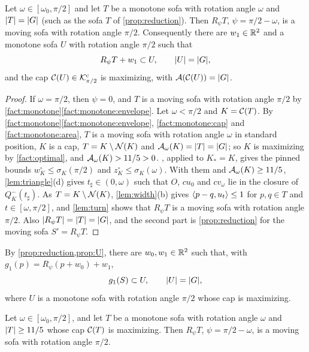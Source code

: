 \begin{proposition}\label{prop:U}
Let $\omega\in[\omega_0,\pi/2]$ and let $T$ be a monotone sofa with rotation
angle $\omega$ and $\lvert T\rvert=\lvert G\rvert$ (such as the sofa $T$ of
\cref{prop:reduction}). Then $R_\psi T$, $\psi=\pi/2-\omega$, is a moving sofa
with rotation angle $\pi/2$. Consequently there are $w_1\in\mathbb{R}^2$ and a monotone
sofa $U$ with rotation angle $\pi/2$ such that
\[
  R_\psi T+w_1\subset U,\qquad\lvert U\rvert=\lvert G\rvert,
\]
and the cap $\mathcal{C}(U)\in\mathcal{K}^{\mathrm{c}}_{\pi/2}$ is maximizing, with $\mathcal{A}(\mathcal{C}(U))=\lvert G\rvert$.
\end{proposition}

\begin{proof}
If $\omega=\pi/2$, then $\psi=0$, and $T$ is a moving sofa with rotation angle
$\pi/2$ by \cref{fact:monotone}\ref{fact:monotone:envelope}. Let $\omega<\pi/2$
and $K=\mathcal{C}(T)$. By \cref{fact:monotone}\ref{fact:monotone:envelope},
\ref{fact:monotone:cap} and \ref{fact:monotone:area}, $T$ is a moving sofa with
rotation angle $\omega$ in standard position, $K$ is a cap, $T=K\setminus\mathcal{N}(K)$
and $\mathcal{A}_\omega(K)=\lvert T\rvert=\lvert G\rvert$; so $K$ is maximizing by \cref{fact:optimal},
and $\mathcal{A}_\omega(K)>11/5>0$. , applied to $K_*=K$, gives
the pinned bounds $w^\circ_K\le\sigma_K(\pi/2)$ and
$z^\circ_K\le\sigma_K(\omega)$. With them and $\mathcal{A}_\omega(K)\ge11/5$,
\cref{lem:triangle}(d) gives $t_\sharp\in(0,\omega)$ such that $O$, $cu_0$ and
$cv_\omega$ lie in the closure of $Q^-_K(t_\sharp)$. As $T=K\setminus\mathcal{N}(K)$,
\cref{lem:width}(b) gives $\langle p-q,u_t\rangle\le1$ for $p,q\in T$ and
$t\in[\omega,\pi/2]$, and \cref{lem:turn} shows that $R_\psi T$ is a moving sofa
with rotation angle $\pi/2$. Also $\lvert R_\psi T\rvert=\lvert T\rvert=\lvert G\rvert$, and the
second part is \cref{prop:reduction} for the moving sofa $S'=R_\psi T$.
\end{proof}

By \cref{prop:reduction,prop:U}, there are $w_0,w_1\in\mathbb{R}^2$ such that, with
$g_1(p)=R_\psi(p+w_0)+w_1$,
\begin{equation}\label{eq:contained}
  g_1(S)\subset U,\qquad \lvert U\rvert=\lvert G\rvert,
\end{equation}
where $U$ is a monotone sofa with rotation angle $\pi/2$ whose cap is
maximizing.

\begin{lemma}\label{lem:right-motion}
Let $\omega\in[\omega_0,\pi/2]$, and let $T$ be a monotone sofa with rotation
angle $\omega$ and $\lvert T\rvert\ge11/5$ whose cap $\mathcal{C}(T)$ is maximizing. Then
$R_\psi T$, $\psi=\pi/2-\omega$, is a moving sofa with rotation angle $\pi/2$.
\end{lemma}

